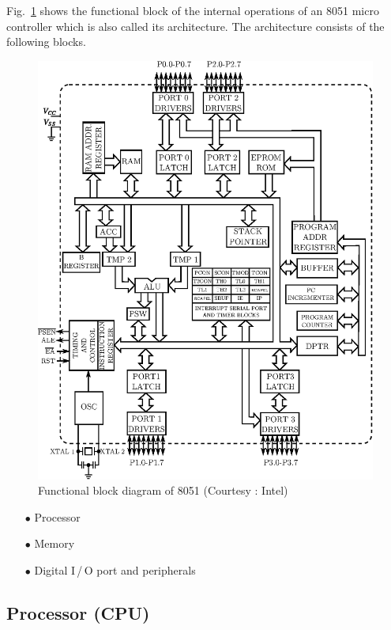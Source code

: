 Fig.~\ref{fig7.8} shows the functional block of the internal operations of an 8051 micro controller which is also called its architecture. The architecture consists of the following blocks.
\begin{figure}[H]
\centering
\includegraphics{chap7/fig7.8.eps}
\caption{Functional block diagram of 8051 (Courtesy : Intel)}\label{fig7.8}
\end{figure}
\begin{itemize}
\itemsep=2pt
\item[$\bullet$] Processor

\item[$\bullet$] Memory

\item[$\bullet$] Digital I\,/\,O port and peripherals
\end{itemize}

\subsection*{Processor (CPU)}


